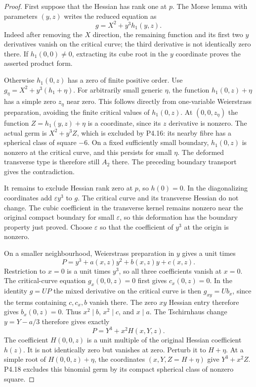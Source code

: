 \begin{proof}
First suppose that the Hessian has
rank one at $p$. The Morse lemma with
parameters $(y,z)$ writes the reduced
equation as
\[
 g=X^2+y^3h_1(y,z).
\]
Indeed after removing the $X$ direction,
the remaining function and its first
two $y$ derivatives vanish on the
critical curve; the third derivative
is not identically zero there. If
$h_1(0,0)\ne0$, extracting its cube
root in the $y$ coordinate proves the
asserted product form.

Otherwise $h_1(0,z)$ has a zero of
finite positive order. Use
$g_\eta=X^2+y^3(h_1+\eta)$.
For arbitrarily small generic $\eta$,
the function $h_1(0,z)+\eta$ has a
simple zero $z_\eta$ near zero.
This follows directly from one-variable
Weierstrass preparation, avoiding the
finite critical values of $h_1(0,z)$.
At $(0,0,z_\eta)$ the function
$Z=h_1(y,z)+\eta$ is a coordinate,
since its $z$ derivative is nonzero.
The actual germ is
$X^2+y^3Z$, which is excluded by
P4.16: its nearby fibre has a
spherical class of square $-6$.
On a fixed sufficiently small boundary,
$h_1(0,z)$ is nonzero at the critical
curve, and this persists for small
$\eta$. The deformed transverse type
is therefore still $A_2$ there.
The preceding boundary transport gives
the contradiction.

It remains to exclude Hessian rank
zero at $p$, so $h(0)=0$. In the
diagonalizing coordinates add
$\varepsilon y^3$ to $g$. The
critical curve and its transverse
Hessian do not change. The cubic
coefficient in the transverse kernel
remains nonzero near the original
compact boundary for small
$\varepsilon$, so this deformation
has the boundary property just proved.
Choose $\varepsilon$ so that the
coefficient of $y^3$ at the origin
is nonzero.

On a smaller neighbourhood, Weierstrass
preparation in $y$ gives a unit times
\[
 P=y^3+a(x,z)y^2+b(x,z)y+c(x,z).
\]
Restriction to $x=0$ is a unit times
$y^3$, so all three coefficients
vanish at $x=0$. The critical-curve
equation $g_x(0,0,z)=0$ first gives
$c_x(0,z)=0$. In the identity
$g=U P$ the mixed derivative on
the critical curve is then
$g_{xy}=U b_x$, since the terms
containing $c,c_x,b$ vanish there.
The zero $xy$ Hessian entry therefore
gives $b_x(0,z)=0$. Thus
$x^2\mid b$, $x^2\mid c$, and
$x\mid a$.
The Tschirnhaus change $y=Y-a/3$
therefore gives exactly
\[
 P=Y^3+x^2H(x,Y,z).
\]
The coefficient $H(0,0,z)$ is a unit
multiple of the original Hessian
coefficient $h(z)$. It is not
identically zero but vanishes at
zero. Perturb it to $H+\eta$.
At a simple root of
$H(0,0,z)+\eta$, the coordinates
$(x,Y,Z=H+\eta)$ give
$Y^3+x^2Z$. P4.18 excludes this
binomial germ by its compact
spherical class of nonzero square.


\end{proof}
